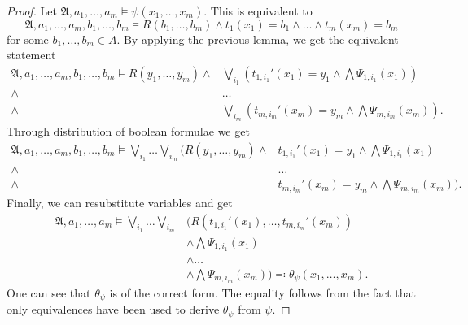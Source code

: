 \begin{proof}
	Let $\mathfrak A,a_1,\dots,a_m\models\psi(x_1,\dots,x_m)$.
	This is equivalent to 
	$$\mathfrak A,a_1,\dots,a_m,b_1,\dots,b_m\models R(b_1,\dots,b_m)\land t_1(x_1)=b_1\land\dots\land t_m(x_m)=b_m$$
	for some $b_1,\dots,b_m\in A$.
	By applying the previous lemma, we get the equivalent statement
	\begin{align*}
		\mathfrak A,a_1,\dots,a_m,b_1,\dots,b_m\models R(y_1,\dots,y_m) \land& \bigvee_{i_1}\left(t_{1,i_1}'(x_1)=y_1\land \bigwedge\Psi_{1,i_1}(x_1)\right) \\
		\land& \dots \\
		\land& \bigvee_{i_m}\left(t_{m,i_m}'(x_m)=y_m\land \bigwedge\Psi_{m,i_m}(x_m)\right).
	\end{align*}
	Through distribution of boolean formulae we get
	\begin{align}
		\mathfrak A,a_1,\dots,a_m,b_1,\dots,b_m\models \bigvee_{i_1} \dots \bigvee_{i_m} ( R(y_1,\dots,y_m)\land & t_{1,i_1}'(x_1)=y_1 \land \bigwedge\Psi_{1,i_1}(x_1) \nonumber \\
		\land & \dots \label{EquivalentDistributedAtomic}\\
		\land & t_{m,i_m}'(x_m)=y_m \land \bigwedge\Psi_{m,i_m}(x_m) ). \nonumber
	\end{align}
	Finally, we can resubstitute variables and get
	\begin{align*}
		\mathfrak A,a_1,\dots,a_m\models \bigvee_{i_1}\dots\bigvee_{i_m} &(R(t_{1,i_1}'(x_1),\dots,t_{m,i_m}'(x_m)) \\
		&\land \bigwedge\Psi_{1,i_1}(x_1) \\
		&\land\dots \\
		&\land\bigwedge\Psi_{m,i_m}(x_m))\eqqcolon \theta_\psi(x_1,\dots,x_m).
	\end{align*}
	One can see that $\theta_\psi$ is of the correct form.
	The equality follows from the fact that only equivalences have been used to derive $\theta_\psi$ from $\psi$.
	

\end{proof}
